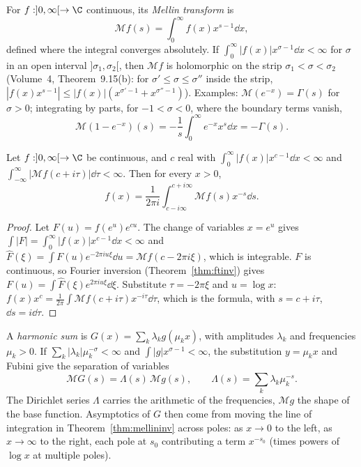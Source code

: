 For $f:]0,\infty[\to\C$ continuous, its \emph{Mellin transform} is
\[
\mathcal Mf(s)=\int_0^\infty f(x)x^{s-1}\dd x,
\]
defined where the integral converges absolutely. If $\int_0^\infty|f(x)|x^{\sigma-1}\dd x<\infty$ for $\sigma$ in an open interval $]\sigma_1,\sigma_2[$, then $\mathcal Mf$ is holomorphic on the strip $\sigma_1<\sigma<\sigma_2$
(Volume~4, Theorem~9.15(b): for $\sigma'\le\sigma\le\sigma''$ inside the strip, $|f(x)x^{s-1}|\le|f(x)|(x^{\sigma'-1}+x^{\sigma''-1})$). Examples: $\mathcal M(e^{-x})=\Gamma(s)$ for $\sigma>0$; integrating by parts,
for $-1<\sigma<0$, where the boundary terms vanish,
\begin{equation}\label{eq:mellin1me}
\mathcal M(1-e^{-x})(s)=-\frac1s\int_0^\infty e^{-x}x^s\dd x=-\Gamma(s).
\end{equation}

\begin{theorem}\label{thm:mellininv}
Let $f:]0,\infty[\to\C$ be continuous, and $c$ real with $\int_0^\infty|f(x)|x^{c-1}\dd x<\infty$ and $\int_{-\infty}^\infty|\mathcal Mf(c+i\tau)|\dd\tau<\infty$. Then for every $x>0$,
\[
f(x)=\frac1{2\pi i}\int_{c-i\infty}^{c+i\infty}\mathcal Mf(s)x^{-s}\dd s.
\]
\end{theorem}
\begin{proof}
Let $F(u)=f(e^u)e^{cu}$. The change of variables $x=e^u$ gives $\int|F|=\int_0^\infty|f(x)|x^{c-1}\dd x<\infty$ and $\hat F(\xi)=\int F(u)e^{-2\pi iu\xi}\dd u=\mathcal Mf(c-2\pi i\xi)$, which is integrable. $F$ is continuous, so
Fourier inversion (Theorem~\ref{thm:ftinv}) gives $F(u)=\int\hat F(\xi)e^{2\pi iu\xi}\dd\xi$. Substitute $\tau=-2\pi\xi$ and $u=\log x$: $f(x)x^c=\frac1{2\pi}\int\mathcal Mf(c+i\tau)x^{-i\tau}\dd\tau$, which is the
formula, with $s=c+i\tau$, $\dd s=i\dd\tau$.
\end{proof}

A \emph{harmonic sum} is $G(x)=\sum_k\lambda_kg(\mu_kx)$, with amplitudes $\lambda_k$ and frequencies $\mu_k>0$. If $\sum_k|\lambda_k|\mu_k^{-\sigma}<\infty$ and $\int|g|x^{\sigma-1}<\infty$, the substitution $y=\mu_kx$ and
Fubini give the separation of variables
\begin{equation}\label{eq:harmonicsum}
\mathcal MG(s)=\Lambda(s)\,\mathcal Mg(s),\qquad\Lambda(s)=\sum_k\lambda_k\mu_k^{-s}.
\end{equation}
The Dirichlet series $\Lambda$ carries the arithmetic of the frequencies, $\mathcal Mg$ the shape of the base function. Asymptotics of $G$ then come from moving the line of integration in
Theorem~\ref{thm:mellininv} across poles: as $x\to0$ to the left, as $x\to\infty$ to the right, each pole at $s_0$ contributing a term $x^{-s_0}$ (times powers of $\log x$ at multiple poles).

